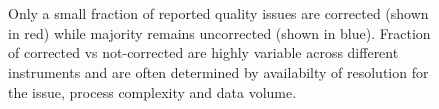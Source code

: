 \begin{figure}
 \\
 \\
 \caption{Only a small fraction of reported quality issues are corrected
 (shown in red) while majority remains uncorrected (shown in blue).
	 Fraction of corrected vs not-corrected are highly variable across
	 different instruments and are often determined by availabilty of
	 resolution for the issue, process complexity and data volume.}
 \label{fig:dqr_instrument_per_year}
\end{figure}
